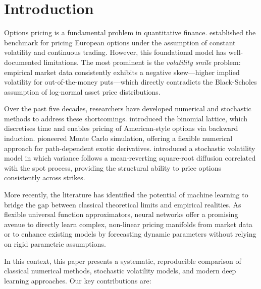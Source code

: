 \documentclass[12pt,a4paper]{article}
\begin{document}
\tableofcontents
\newpage

\section{Introduction}

Options pricing is a fundamental problem in quantitative finance.
\citet{BlackScholes1973} established the benchmark for pricing European options
under the assumption of constant volatility and continuous trading.
However, this foundational model has well-documented limitations.
The most prominent is the \emph{volatility smile} problem: empirical market data
consistently exhibits a negative skew---higher implied volatility for
out-of-the-money puts---which directly contradicts the Black-Scholes
assumption of log-normal asset price distributions.

Over the past five decades, researchers have developed numerical and stochastic
methods to address these shortcomings.
\citet{CRR1979} introduced the binomial lattice, which discretises time and
enables pricing of American-style options via backward induction.
\citet{Boyle1977} pioneered Monte Carlo simulation, offering a flexible
numerical approach for path-dependent exotic derivatives.
\citet{Heston1993} introduced a stochastic volatility model in which variance
follows a mean-reverting square-root diffusion correlated with the spot process,
providing the structural ability to price options consistently across strikes.

More recently, the literature has identified the potential of machine learning
to bridge the gap between classical theoretical limits and empirical realities.
As flexible universal function approximators, neural networks offer a promising
avenue to directly learn complex, non-linear pricing manifolds from market data
or to enhance existing models by forecasting dynamic parameters without relying
on rigid parametric assumptions.

In this context, this paper presents a systematic, reproducible comparison of
classical numerical methods, stochastic volatility models, and modern deep
learning approaches.
Our key contributions are:
\end{document}
